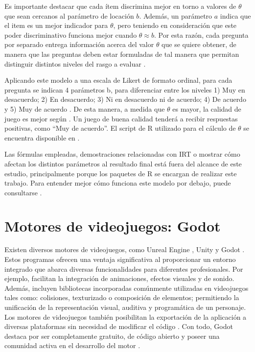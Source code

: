 Es importante destacar que cada ítem discrimina mejor en torno a valores de $\theta$ que sean cercanos al parámetro de locación $b$. Además, un parámetro $a$ indica que el item es un mejor indicador para $\theta$, pero teniendo en consideración que este poder discriminativo funciona mejor cuando $\theta \approx b$. Por esta razón, cada pregunta por separado entrega información acerca del valor $\theta$ que se quiere obtener, de manera que las preguntas deben estar formuladas de tal manera que permitan distinguir distintos niveles del rasgo a evaluar \cite{TeoriaRespuestaAlItemPsicologia}.

Aplicando este modelo a una escala de Likert de formato ordinal, para cada pregunta se indican 4 parámetros b, para diferenciar entre los niveles 1) Muy en desacuerdo; 2) En desacuerdo; 3) Ni en desacuerdo ni de acuerdo; 4) De acuerdo y 5) Muy de acuerdo \cite{TeoriaRespuestaAlItemPsicologia, meegaplusQualityEvaluationPage}. De esta manera, a medida que $\theta$ es mayor, la calidad de juego es mejor según \cite{meegaplusQualityEvaluationPage}. Un juego de buena calidad tenderá a recibir respuestas positivas, como  ``Muy de acuerdo''. El script de R utilizado para el cálculo de $\theta$ se encuentra disponible en \cite{meegaplusQualityEvaluationPage}.

Las fórmulas empleadas, demostraciones relacionadas con IRT o mostrar cómo afectan los distintos parámetros al resultado final está fuera del alcance de este estudio, principalmente porque los paquetes de R se encargan de realizar este trabajo. Para entender mejor cómo funciona este modelo por debajo, puede consultarse \cite{IRTShojima2022, CalderonStatisticalIRT}.

\section{Motores de videojuegos: Godot}

Existen diversos motores de videojuegos, como Unreal Engine \cite{UE}, Unity \cite{Unity} y Godot \cite{Godot}. Estos programas ofrecen una ventaja significativa al proporcionar un entorno integrado que abarca diversas funcionalidades para diferentes profesionales. Por ejemplo, facilitan la integración de animaciones, efectos visuales y de sonido. Además, incluyen bibliotecas incorporadas comúnmente utilizadas en videojuegos tales como: colisiones, texturizado o composición de elementos; permitiendo la unificación de la representación visual, auditiva y programática de un personaje. Los motores de videojuegos también posibilitan la exportación de la aplicación a diversas plataformas sin necesidad de modificar el código \cite{GodotExport}. Con todo, Godot destaca por ser completamente gratuito, de código abierto y poseer una comunidad activa en el desarrollo del motor \cite{GodotGithubRepository}.


